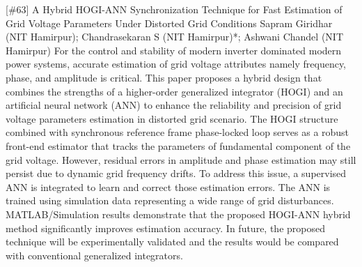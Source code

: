 {} \begin{abstract_online} {[\#63] A Hybrid HOGI-ANN Synchronization Technique for Fast Estimation of Grid Voltage Parameters Under Distorted Grid Conditions} {} {Sapram Giridhar (NIT Hamirpur); Chandrasekaran S (NIT Hamirpur)*; Ashwani Chandel (NIT Hamirpur)} {} For the control and stability of modern inverter dominated modern power systems, accurate estimation of grid voltage attributes namely frequency, phase, and amplitude is critical. This paper proposes a hybrid design that combines the strengths of a higher-order generalized integrator (HOGI) and an artificial neural network (ANN) to enhance the reliability and precision of grid voltage parameters estimation in distorted grid scenario. The HOGI structure combined with synchronous reference frame phase-locked loop serves as a robust front-end estimator that tracks the parameters of fundamental component of the grid voltage. However, residual errors in amplitude and phase estimation may still persist due to dynamic grid frequency drifts. To address this issue, a supervised ANN is integrated to learn and correct those estimation errors. The ANN is trained using simulation data representing a wide range of grid disturbances. MATLAB/Simulation results demonstrate that the proposed HOGI-ANN hybrid method significantly improves estimation accuracy. In future, the proposed technique will be experimentally validated and the results would be compared with conventional generalized integrators. \end{abstract_online} 
